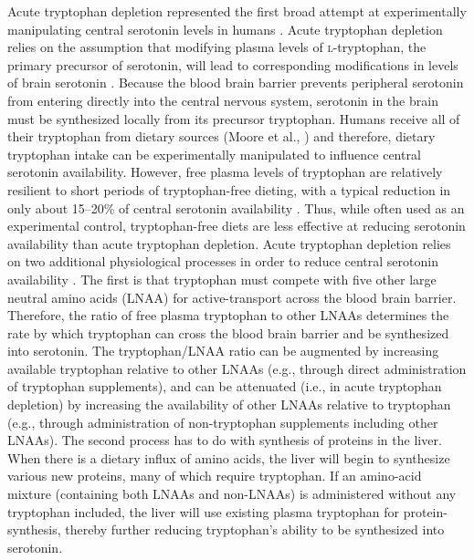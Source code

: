 \indent Acute tryptophan depletion represented the first broad attempt at experimentally manipulating central serotonin levels in humans \parencite{Young1985}. Acute tryptophan depletion relies on the assumption that modifying plasma levels of  \textsc{l}-tryptophan, the primary precursor of serotonin, will lead to corresponding  modifications in levels of brain serotonin \parencite{Hood05}. Because the blood brain barrier prevents peripheral serotonin from entering directly into the central nervous system, serotonin in the brain must be synthesized locally from its precursor tryptophan. Humans receive all of their tryptophan from dietary sources (Moore et al., \citeyear{Moore2000}) and therefore, dietary tryptophan intake can be experimentally manipulated to influence central serotonin availability. However, free plasma levels of tryptophan are relatively resilient to short periods of tryptophan-free dieting, with a typical reduction in only about 15--20\% of central serotonin availability \parencite{Delgado89}. Thus, while often used as an experimental control, tryptophan-free diets are less effective at reducing serotonin availability than acute tryptophan depletion. Acute tryptophan depletion relies on two additional physiological processes in order to reduce central serotonin availability \parencite[for an overview of the rationale and methodology of acute tryptophan depletion, see][]{Hood05}. The first is that tryptophan must compete with five other large neutral amino acids (LNAA) for active-transport across the blood brain barrier. Therefore, the ratio of free plasma tryptophan to other LNAAs determines the rate by which tryptophan can cross the blood brain barrier and be synthesized into serotonin. The tryptophan/LNAA ratio can be augmented by increasing available tryptophan relative to other LNAAs (e.g., through direct administration of tryptophan supplements), and can be attenuated (i.e., in acute tryptophan depletion) by increasing the availability of other LNAAs relative to tryptophan (e.g., through administration of non-tryptophan supplements including other LNAAs). The second process has to do with synthesis of proteins in the liver. When there is a dietary influx of amino acids, the liver will begin to synthesize various new proteins, many of which require tryptophan. If an amino-acid mixture (containing both LNAAs and non-LNAAs) is administered without any tryptophan included, the liver will use existing plasma tryptophan for protein-synthesis, thereby further reducing tryptophan's ability to be synthesized into serotonin.


